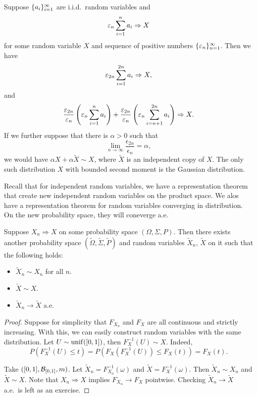 \documentclass[a4paper]{article}
\newcommand{\convd}{\Rightarrow}
\begin{document}
\begin{eg}
  Suppose $\{ a_i \}_{i=1}^\infty$ are i.i.d.\ random variables and 
  \[
  \epsilon_n \sumi^n a_i \convd X
  \]
  for some random variable $X$ and sequence of positive 
  numbers $\{ \varepsilon_n \}_{n=1}^\infty$.
  Then we have 
  \[
  \epsilon_{2n} \sumi^{2n} a_i \convd X,
  \]
  and 
  \[
  \frac{\epsilon_{2n}}{\epsilon_n} \left( \epsilon_n \sumi^n a_i \right)
  + \frac{\epsilon_{2n}}{\epsilon_n} \left( \epsilon_n \sum_{i=n+1}^{2n} a_i \right)
  \convd X.
  \]
  If we further suppose that there is $\alpha > 0$ such that 
  \[
  \lim_{n \to \infty} \frac{\epsilon_{2n}}{\epsilon_n} = \alpha,
  \]
  we would have $\alpha X + \alpha \tilde{X} \sim X$, where 
  $\tilde{X}$ is an independent copy of $X$. The only such distribution 
  $X$ with bounded second moment is the Gaussian distribution.

\end{eg}

Recall that for independent random variables, we have a representation 
theorem that create new independent random variables on the product space.
We alos have a representation theorem for random variables converging 
in distribution. On the new probability space, they will coneverge a.e.\

\begin{thm}
  Suppose $X_n \convd X$ on some probability space $(\Omega, \Sigma, P)$.
  Then there exists another probability space $(\tilde{\Omega}, 
  \tilde{\Sigma}, \tilde{P})$ and random variables $\tilde{X}_n$, 
  $\tilde{X}$ on it such that the following holds:
  \begin{itemize}
    \item $\tilde{X}_n \sim X_n$ for all $n$.
    \item $\tilde{X} \sim X$.
    \item $\tilde{X}_n \to \tilde{X}$ a.e.\
  \end{itemize}
\end{thm}

\begin{proof}
  Suppose for simplicity that $F_{X_n}$ and $F_X$ are all continuous and 
  strictly increasing. With this, we can easily construct random 
  variables with the same distribution. Let $U \sim \operatorname{unif}([0, 1])$,
  then $F_X^{-1} (U) \sim X$. Indeed, 
  \[
  P \left( F_X^{-1} (U) \leq t \right)
  = P \left( F_X (F_X^{-1} (U)) \leq F_X (t) \right)
  = F_X (t).
  \] 

  Take $([0, 1], \mathcal{B}_{[0, 1]}, m)$. 
  Let $\tilde{X}_n = F_{X_n}^{-1} (\omega)$
  and $\tilde{X} = F_X^{-1} (\omega)$. Then 
  $\tilde{X}_n \sim X_n$ and $\tilde{X} \sim X$.
  Note that $X_n \convd X$ 
  implies $F_{X_n} \to F_X$ pointwise. Checking
  $\tilde{X}_n \to \tilde{X}$ a.e.\ is left as an exercise.

\end{proof}
\end{document}
